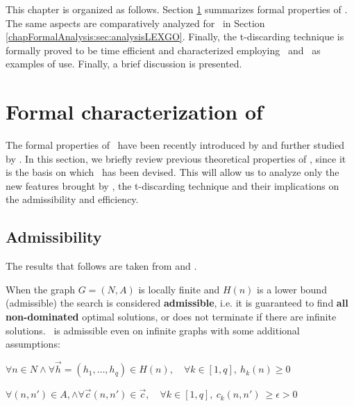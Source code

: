 This chapter is organized as follows. Section \ref{chapFormalAnalysis:sec:analysisNAMOA} summarizes formal properties of \namoa. The same aspects are comparatively analyzed for \lexgo \ in Section \ref{chapFormalAnalysis:sec:analysisLEXGO}. Finally, the t-discarding technique is formally proved to be time efficient and characterized employing \namoate \ and \lexgote \ as examples of use. Finally, a brief discussion is presented. 

\section{Formal characterization of \texorpdfstring{\namoa}{NAMOA*}}
\label{chapFormalAnalysis:sec:analysisNAMOA}

The formal properties of \namoa \ have been recently introduced by \citet{Mandow2010} and further studied by \citet{Machuca2012a}. In this section, 
we briefly review previous theoretical properties of \namoa, since it is the basis on which \lexgo \ has been devised. This will allow us to analyze only the new features brought by \lexgo, the t-discarding technique and their implications on the admissibility and efficiency.

\subsection{Admissibility}
\label{chapFormalAnalysis:sec:admissibilityNamoa}

The results that follows are taken from  \citet{Mandow2010} and \citet{Machuca2012a}.

\begin{property}[Admissibility]\label{chapFormalAnalysis:prop:multiObjAdmissibilityNamoa}

When the graph $G=(N,A)$ is locally finite and $H(n)$ is a lower bound (admissible) the search is considered \textbf{admissible}, i.e. it is guaranteed to find \textbf{all non-dominated} optimal solutions, or does not terminate if there are infinite solutions. \namoa \ is admissible even on infinite graphs with some additional assumptions:

\begin{description}\label{chapFormalAnalysis:eq:multiObjAdmissibilityCondNamoa}
  \centering      
\item[a)] 
$\forall n \in N \land \forall \vec h =(h_1,\ldots ,h_q) \in H(n), \quad \forall k \in [1,q], \ h_k(n) \geq 0$
	 \item[b)] 
$\forall (n,n') \in A,  \land \forall \vec  c(n,n') \in \vec c, \quad \forall k \in [1,q], \ c_k(n,n') \ \geq \epsilon > 0$  
\end{description}
\end{property}

